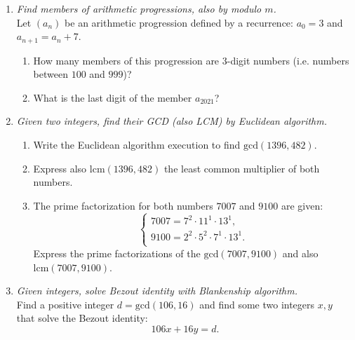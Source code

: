 \documentclass[a4paper,12pt]{article}
\begin{document}
\begin{enumerate}
\item {\small \em
Find members of arithmetic progressions, also by modulo $m$.}\\
Let $(a_n)$ be an arithmetic progression defined by a recurrence:
$a_0 = 3$ and $a_{n+1} = a_n + 7$.
\begin{enumerate}
\item How many members of this progression are $3$-digit numbers
(i.e. numbers between $100$ and $999$)?
\item
What is the last digit of the member $a_{2021}$?
\end{enumerate}

\item {\small \em
Given two integers, find their GCD (also LCM) by Euclidean algorithm.}\\
\begin{enumerate}
\item
Write the Euclidean algorithm execution to find $\text{gcd}(1396,482)$.
\item
Express also $\text{lcm}(1396,482)$ \textendash{} the least common multiplier
of both numbers.
\item
The prime factorization for both numbers $7007$ and $9100$ are given:
\[ \left\{  \begin{array}{l}
7007 = 7^2 \cdot 11^1 \cdot 13^1,\\
9100 = 2^2 \cdot 5^2 \cdot 7^1 \cdot 13^1.\\
\end{array} \right. \]
Express the prime factorizations of the $\text{gcd}(7007,9100)$
and also  $\text{lcm}(7007,9100)$.
\end{enumerate}

\item {\small \em
Given integers, solve Bezout identity with Blankenship algorithm.}\\
Find a positive integer $d = \text{gcd}(106,16)$ and find some two integers $x,y$ that solve
the Bezout identity:
\[ 106x + 16y = d. \]




\end{enumerate}
\end{document}
